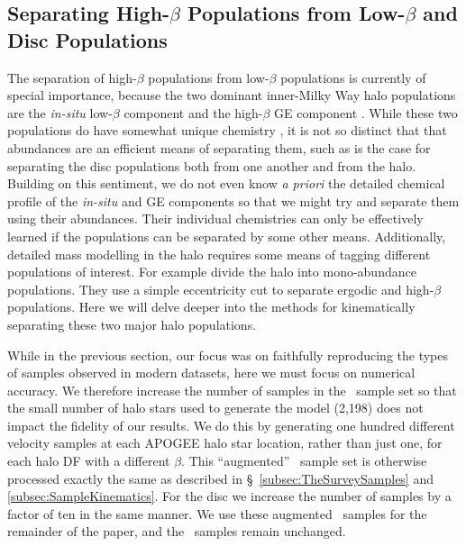 \subsection{Separating High-\texorpdfstring{$\beta$}{beta} Populations from Low-\texorpdfstring{$\beta$}{beta} and Disc Populations}
\label{subsec:SeparatingHighBetaPopulations}

The separation of high-$\beta$ populations from low-$\beta$ populations is currently of special importance, because the two dominant inner-Milky Way halo populations are the \textit{in-situ} low-$\beta$ component and the high-$\beta$ GE component \citep{belokurov18,helmi18,iorio21}. While these two populations do have somewhat unique chemistry \citep{haywood18}, it is not so distinct that that abundances are an efficient means of separating them, such as is the case for separating the disc populations both from one another and from the halo. Building on this sentiment, we do not even know \textit{a priori} the detailed chemical profile of the \textit{in-situ} and GE components so that we might try and separate them using their abundances. Their individual chemistries can only be effectively learned if the populations can be separated by some other means. Additionally, detailed mass modelling in the halo requires some means of tagging different populations of interest. For example \citet{mackereth20} divide the halo into mono-abundance populations. They use a simple eccentricity cut to separate ergodic and high-$\beta$ populations. Here we will delve deeper into the methods for kinematically separating these two major halo populations.

While in the previous section, our focus was on faithfully reproducing the types of samples observed in modern datasets, here we must focus on numerical accuracy. We therefore increase the number of samples in the \survey\ sample set so that the small number of halo stars used to generate the model (2,198) does not impact the fidelity of our results. We do this by generating one hundred different velocity samples at each APOGEE halo star location, rather than just one, for each halo DF with a different $\beta$. This ``augmented'' \survey\ sample set is otherwise processed exactly the same as described in \S~\ref{subsec:TheSurveySamples} and \ref{subsec:SampleKinematics}. For the disc we increase the number of samples by a factor of ten in the same manner. We use these augmented \survey\ samples for the remainder of the paper, and the \solar\ samples remain unchanged.

